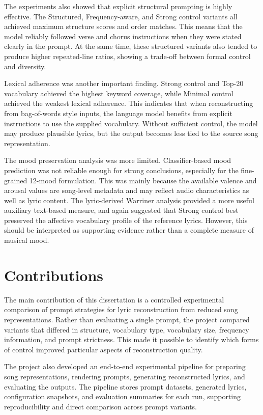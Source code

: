 The experiments also showed that explicit structural prompting is highly effective. The Structured, Frequency-aware, and Strong control variants all achieved maximum structure scores and order matches. This means that the model reliably followed verse and chorus instructions when they were stated clearly in the prompt. At the same time, these structured variants also tended to produce higher repeated-line ratios, showing a trade-off between formal control and diversity.

Lexical adherence was another important finding. Strong control and Top-20 vocabulary achieved the highest keyword coverage, while Minimal control achieved the weakest lexical adherence. This indicates that when reconstructing from bag-of-words style inputs, the language model benefits from explicit instructions to use the supplied vocabulary. Without sufficient control, the model may produce plausible lyrics, but the output becomes less tied to the source song representation.

The mood preservation analysis was more limited. Classifier-based mood prediction was not reliable enough for strong conclusions, especially for the fine-grained 12-mood formulation. This was mainly because the available valence and arousal values are song-level metadata and may reflect audio characteristics as well as lyric content. The lyric-derived Warriner analysis provided a more useful auxiliary text-based measure, and again suggested that Strong control best preserved the affective vocabulary profile of the reference lyrics. However, this should be interpreted as supporting evidence rather than a complete measure of musical mood.

\section{Contributions}

The main contribution of this dissertation is a controlled experimental comparison of prompt strategies for lyric reconstruction from reduced song representations. Rather than evaluating a single prompt, the project compared variants that differed in structure, vocabulary type, vocabulary size, frequency information, and prompt strictness. This made it possible to identify which forms of control improved particular aspects of reconstruction quality.

The project also developed an end-to-end experimental pipeline for preparing song representations, rendering prompts, generating reconstructed lyrics, and evaluating the outputs. The pipeline stores prompt datasets, generated lyrics, configuration snapshots, and evaluation summaries for each run, supporting reproducibility and direct comparison across prompt variants.

